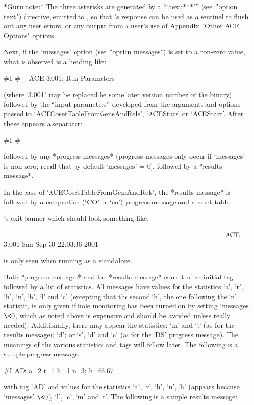 *Guru note:*
The three asterisks are generated  by  a  ```text:***'''  (see~"option
text") directive, emitted to {\ACE}, so that {\ACE}'s response can  be
used as a sentinel to flush out any user errors, or any output from  a
user's use of Appendix~"Other ACE Options" options.

Next, if the `messages' option (see~"option messages")  is  set  to  a
non-zero value, what is observed is a heading like:

\begintt
#I    #--- ACE 3.001: Run Parameters ---
\endtt

(where `3.001' may be replaced be some later  version  number  of  the
{\ACE} binary) followed by the ``input parameters'' developed from the
arguments  and  options  passed   to   `ACECosetTableFromGensAndRels',
`ACEStats' or `ACEStart'. After these appears a separator:

\begintt
#I    #---------------------------------
\endtt

followed by any *progress messages* (progress messages only  occur  if
`messages' is non-zero;  recall  that  by  default  `messages'  =  0),
followed by a *results message*.

In the case of `ACECosetTableFromGensAndRels', the  *results  message*
is followed by a compaction (`CO' or  `co')  progress  message  and  a
coset table.

{\ACE}'s exit banner which should look something like:

\begintt
=========================================
ACE 3.001        Sun Sep 30 22:03:36 2001
\endtt

is only seen when running {\ACE} as a standalone.

Both *progress messages* and  the  *results  message*  consist  of  an
initial tag followed by a list of statistics. All messages have values
for the statistics `a', `r', `h', `n', `h',  `l'  and  `c'  (excepting
that the second `h', the one following  the  `n'  statistic,  is  only
given if hole monitoring has been turned on by setting `messages'  $\<
0$, which as noted above is expensive and  should  be  avoided  unless
really needed). Additionally, there may appear the statistics: `m' and
`t' (as for the results message); `d'; or `s', `d' and `c' (as for the
`DS' progress message). The meanings of  the  various  statistics  and
tags will follow later. The following is a sample progress message:

\begintt
#I  AD: a=2 r=1 h=1 n=3; h=66.67%
\endtt

with tag `AD' and values for the statistics `a', `r',  `h',  `n',  `h'
(appears because `messages' $\<  0$),  `l',  `c',  `m'  and  `t'.  The
following is a sample results message:

